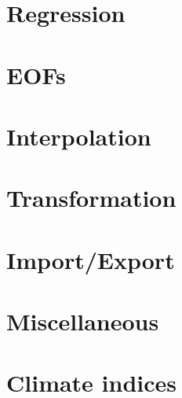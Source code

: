 \newpage
\section{Regression}




\newpage
\section{EOFs}




\newpage
\section{Interpolation}




\newpage
\section{Transformation}




\newpage
\section{Import/Export}




\newpage
\section{Miscellaneous}




\newpage
\section{Climate indices}





